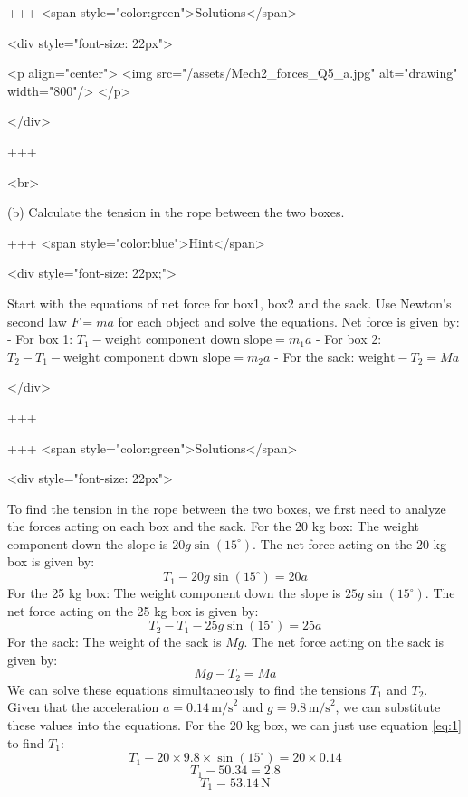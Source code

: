 +++ <span style="color:green">Solutions</span>

<div style="font-size: 22px">

<p align="center">
<img src="/assets/Mech2_forces_Q5_a.jpg" alt="drawing" width="800"/>
</p>

</div>

+++

<br>


(b) Calculate the tension in the rope between the two boxes.

+++ <span style="color:blue">Hint</span>

<div style="font-size: 22px;">

Start with the equations of net force for box1, box2 and the sack. Use Newton's second law \(F = ma\) for each object and solve the equations.
Net force is given by:
- For box 1: \(T_1 - \text{weight component down slope} = m_1 a\)
- For box 2: \(T_2 - T_1 - \text{weight component down slope} = m_2 a\)
- For the sack: \(\text{weight} - T_2 = Ma\)

</div>

+++

+++ <span style="color:green">Solutions</span>

<div style="font-size: 22px">

To find the tension in the rope between the two boxes, we first need to analyze the forces acting on each box and the sack.
For the 20 kg box:
The weight component down the slope is \(20g \sin(15^\circ)\).
The net force acting on the 20 kg box is given by:
\begin{equation}
T_1 - 20g \sin(15^\circ) = 20a\label{eq:1}
\end{equation}
For the 25 kg box:
The weight component down the slope is \(25g \sin(15^\circ)\).
The net force acting on the 25 kg box is given by:
\begin{equation}
T_2 - T_1 - 25g \sin(15^\circ) = 25a
\end{equation}
For the sack:
The weight of the sack is \(Mg\).
The net force acting on the sack is given by:
\begin{equation}
Mg - T_2 = Ma
\end{equation}
We can solve these equations simultaneously to find the tensions \(T_1\) and \(T_2\). Given that the acceleration \(a = 0.14 \, \text{m/s}^2\) and \(g = 9.8 \, \text{m/s}^2\), we can substitute these values into the equations.
For the 20 kg box, we can just use equation \eqref{eq:1} to find \(T_1\):
\[T_1 - 20 \times 9.8 \times \sin(15^\circ) = 20 \times 0.14\]
\[T_1 - 50.34 = 2.8\]
\[T_1 = 53.14 \, \text{N}\]


